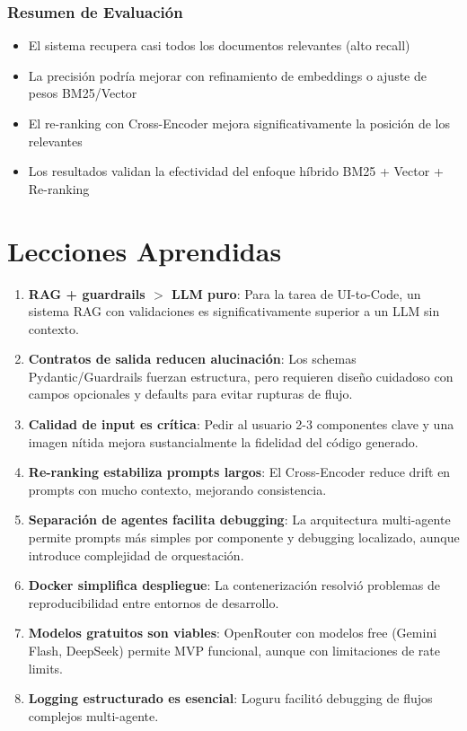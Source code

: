 \documentclass[12pt,a4paper]{article}
\begin{document}
\subsubsection{Resumen de Evaluación}

\begin{itemize}
    \item El sistema recupera casi todos los documentos relevantes (alto recall)
    \item La precisión podría mejorar con refinamiento de embeddings o ajuste de pesos BM25/Vector
    \item El re-ranking con Cross-Encoder mejora significativamente la posición de los relevantes
    \item Los resultados validan la efectividad del enfoque híbrido BM25 + Vector + Re-ranking
\end{itemize}

\section{Lecciones Aprendidas}

\begin{enumerate}
    \item \textbf{RAG + guardrails $>$ LLM puro}: Para la tarea de UI-to-Code, un sistema RAG con validaciones es significativamente superior a un LLM sin contexto.
    
    \item \textbf{Contratos de salida reducen alucinación}: Los schemas Pydantic/Guardrails fuerzan estructura, pero requieren diseño cuidadoso con campos opcionales y defaults para evitar rupturas de flujo.
    
    \item \textbf{Calidad de input es crítica}: Pedir al usuario 2-3 componentes clave y una imagen nítida mejora sustancialmente la fidelidad del código generado.
    
    \item \textbf{Re-ranking estabiliza prompts largos}: El Cross-Encoder reduce drift en prompts con mucho contexto, mejorando consistencia.
    
    \item \textbf{Separación de agentes facilita debugging}: La arquitectura multi-agente permite prompts más simples por componente y debugging localizado, aunque introduce complejidad de orquestación.
    
    \item \textbf{Docker simplifica despliegue}: La contenerización resolvió problemas de reproducibilidad entre entornos de desarrollo.
    
    \item \textbf{Modelos gratuitos son viables}: OpenRouter con modelos free (Gemini Flash, DeepSeek) permite MVP funcional, aunque con limitaciones de rate limits.
    
    \item \textbf{Logging estructurado es esencial}: Loguru facilitó debugging de flujos complejos multi-agente.
\end{enumerate}
\end{document}
